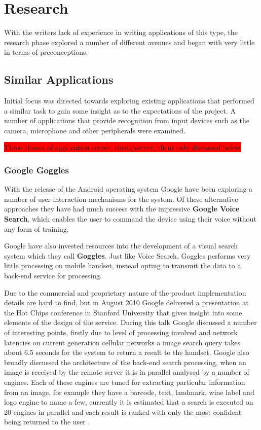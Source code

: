 \chapter{Research}
With the writers lack of experience in writing applications of this type, the research phase explored a number of different avenues and began with very little in terms of preconceptions. 

\section{Similar Applications}
Initial focus was directed towards exploring existing applications that performed a similar task to gain some insight as to the expectations of the project. A number of applications that provide recognition from input devices such as the camera, microphone and other peripherals were examined.

\colorbox{red}{Three classes of application server, client/server, client only discussed below}

\subsection{Google Goggles}
With the release of the Android operating system Google have been exploring a number of user interaction mechanisms for the system. Of these alternative approaches they have had much success with the impressive \textbf{Google Voice Search}, which enables the user to command the device using their voice without any form of training.

Google have also invested resources into the development of a visual search system which they call \textbf{Goggles}. Just like Voice Search, Goggles performs very little processing on mobile handset, instead opting to transmit the data to a back-end service for processing.

Due to the commercial and proprietary nature of the product implementation details are hard to find, but in August 2010 Google delivered a presentation at the Hot Chips conference in Stanford University that gives insight into some elements of the design of the service. During this talk Google discussed a number of interesting points, firstly due to level of processing involved and network latencies on current generation cellular networks a image search query takes about 6.5 seconds for the system to return a result to the handset. Google also broadly discussed the architecture of the back-end search processing, when an image is received by the remote server it is in parallel analysed by a number of engines. Each of these engines are tuned for extracting particular information from an image, for example they have a barcode, text, landmark, wine label and logo engine to name a few, currently it is estimated that a search is executed on 20 engines in parallel and each result is ranked with only the most confident being returned to the user \cite{vbgoggles10, sbs10}.

